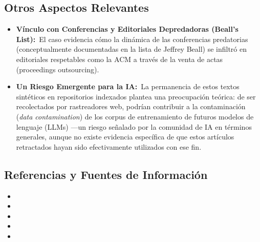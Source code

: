 \documentclass[12pt,a4paper]{article}
\newcommand{\itemlabel}[3]{\textbf{#1#2}~#3}
\begin{document}
\subsection{Otros Aspectos Relevantes}
\begin{itemize}
\item \itemlabel{Vínculo con Conferencias y Editoriales Depredadoras (Beall's List)}{:}{El caso evidencia cómo la dinámica de las \textquotedbl{}conferencias predatorias\textquotedbl{} (conceptualmente documentadas en la lista de Jeffrey Beall) se infiltró en editoriales respetables como la ACM a través de la venta de actas (proceedings outsourcing).}
\item \itemlabel{Un Riesgo Emergente para la IA}{:}{La permanencia de estos textos sintéticos en repositorios indexados plantea una preocupación teórica: de ser recolectados por rastreadores web, podrían contribuir a la contaminación (\textit{data contamination}) de los corpus de entrenamiento de futuros modelos de lenguaje (LLMs) —un riesgo señalado por la comunidad de IA en términos generales, aunque no existe evidencia específica de que estos artículos retractados hayan sido efectivamente utilizados con ese fin.}
\end{itemize}
\subsection{Referencias y Fuentes de Información}
\begin{itemize}
\item {}
\item {}
\item {}
\item {}
\item {}
\end{itemize}
\end{document}
